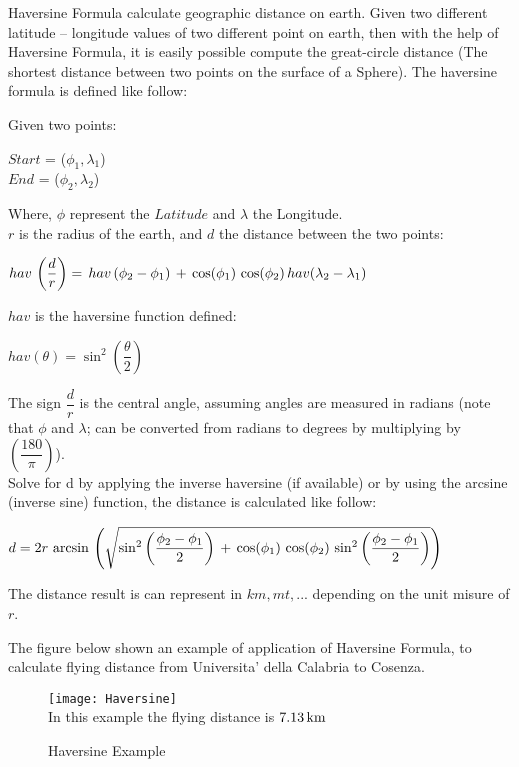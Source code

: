 \documentclass[tesi]{subfiles}
\begin{document}
Haversine Formula calculate geographic distance on earth. Given two different latitude – longitude values of two different point on earth, then with the help of Haversine Formula, it is easily possible compute the great-circle distance (The shortest distance between two points on the surface of a Sphere). 		
\noindent The haversine formula is defined like follow:

\noindent Given two points:
\begin{center}
$Start$ = ($\phi_{1} , \lambda_{1}$)\\
$End$ = ($\phi_{2} , \lambda_{2}$)
\end{center}

Where, $\phi$ represent the $Latitude$ and $\lambda$ the Longitude.\\

$r$ is the radius of the earth, and $d$ the distance between the two points:\\

\begin{center}

$ hav \thinspace \left(\dfrac{d}{r}\right) = \thinspace hav \thinspace (\phi_{2} - \phi_{1}) \thinspace + \thinspace \cos (\phi_{1}) \thinspace \cos(\phi_{2}) \thinspace hav(\lambda_{2} - \lambda_{1})$
\end{center}

\noindent $hav$ is the haversine function defined:

\begin{center}
$hav(\theta) = \sin^{2} \left(\dfrac{\theta}{2}\right)$
\end{center}

\noindent The sign $\dfrac{d}{r}$ is the central angle, assuming angles are measured in radians (note that $\phi$ and $\lambda$; can be converted from radians to degrees by multiplying by $\left(\dfrac{180}{\pi}\right)$).\\
Solve for d by applying the inverse haversine (if available) or by using the arcsine (inverse sine) function, the distance is calculated like follow:

\begin{center}
 $d = 2r \thinspace \arcsin \thinspace \left(\sqrt{\sin^{2} \left(\dfrac{\phi_{2} - \phi_{1}}{2}\right) \thinspace + \thinspace \cos (\phi_{1}) \thinspace \cos(\phi_{2}) \thinspace \sin^{2} \left(\dfrac{\phi_{2} - \phi_{1}}{2}\right) }\right) $
\end{center}


\noindent The distance result is can represent in $km, mt, ...$ depending on the unit misure of $r$.

\noindent The figure below shown an example of application of Haversine Formula, to calculate flying distance from Universita' della Calabria to Cosenza.



\begin{figure}[H]	
\centering
\texttt{[image: Haversine]} 
\\In this example the flying distance is $7.13 \thinspace \si{km}$
 \caption{Haversine Example}
  \label{fig:Haversine Example}
\end{figure}
\end{document}
